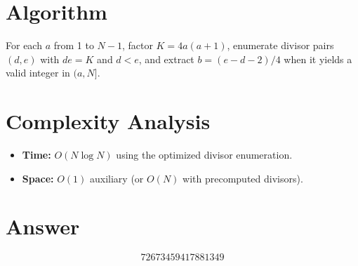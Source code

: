 \documentclass[11pt]{article}
\theoremstyle{definition}
\begin{document}
\section{Algorithm}

For each $a$ from 1 to $N-1$, factor $K = 4a(a+1)$, enumerate divisor pairs $(d, e)$ with $de = K$ and $d < e$, and extract $b = (e - d - 2)/4$ when it yields a valid integer in $(a, N]$.

\section{Complexity Analysis}

\begin{itemize}
\item \textbf{Time:} $O(N \log N)$ using the optimized divisor enumeration.
\item \textbf{Space:} $O(1)$ auxiliary (or $O(N)$ with precomputed divisors).
\end{itemize}

\section{Answer}

\[
\boxed{72673459417881349}
\]
\end{document}

